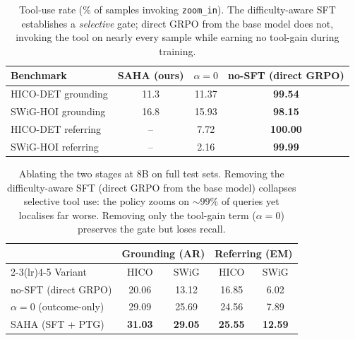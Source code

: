 \begin{table}[t]
\centering
\small
\caption{Tool-use rate (\% of samples invoking \texttt{zoom\_in}). The
difficulty-aware SFT establishes a \emph{selective} gate; direct GRPO from the
base model does not, invoking the tool on nearly every sample while earning no
tool-gain during training.}
\label{tab:tool-selectivity}
\begin{tabular}{lccc}
\toprule
Benchmark & SAHA (ours) & $\alpha{=}0$ & no-SFT (direct GRPO) \\
\midrule
HICO-DET grounding  & 11.3 & 11.37 & \textbf{99.54} \\
SWiG-HOI grounding  & 16.8 & 15.93 & \textbf{98.15} \\
HICO-DET referring  & --   & 7.72  & \textbf{100.00} \\
SWiG-HOI referring  & --   & 2.16  & \textbf{99.99} \\
\bottomrule
\end{tabular}
\end{table}

\begin{table}[t]
\centering
\small
\caption{Ablating the two stages at 8B on full test sets. Removing the
difficulty-aware SFT (direct GRPO from the base model) collapses selective tool
use: the policy zooms on ${\sim}99\%$ of queries yet localises far worse.
Removing only the tool-gain term ($\alpha{=}0$) preserves the gate but loses
recall.}
\label{tab:full-ablation}
\begin{tabular}{lcccc}
\toprule
 & \multicolumn{2}{c}{Grounding (AR)} & \multicolumn{2}{c}{Referring (EM)} \\
\cmidrule(lr){2-3}\cmidrule(lr){4-5}
Variant & HICO & SWiG & HICO & SWiG \\
\midrule
no-SFT (direct GRPO)      & 20.06 & 13.12 & 16.85 & 6.02 \\
$\alpha{=}0$ (outcome-only) & 29.09 & 25.69 & 24.56 & 7.89 \\
SAHA (SFT + PTG)          & \textbf{31.03} & \textbf{29.05} & \textbf{25.55} & \textbf{12.59} \\
\bottomrule
\end{tabular}
\end{table}

